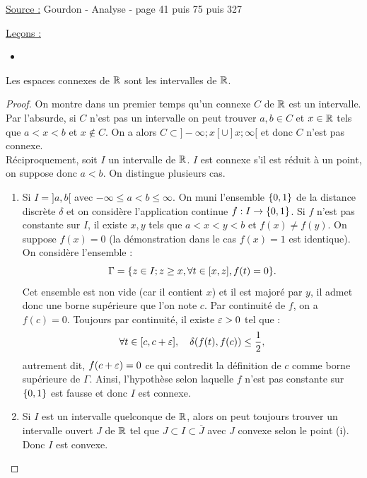 

\pagestyle{fancy}

\fancyhead[C]{}
\fancyhead[R]{}



\underline{Source :} Gourdon - Analyse - page 41 puis 75 puis 327

\underline{Leçons :}
\begin{itemize}
\item 
\end{itemize}

\begin{thm}
Les espaces connexes de $\mathbb{R}$ sont les intervalles de $\mathbb{R}$.
\end{thm}

\begin{proof}
On montre dans un premier temps qu'un connexe $C$ de $\mathbb{R}$ est un intervalle. 
Par l'absurde, si $C$ n'est pas un intervalle on peut trouver $a,b \in C$ et $x \in \mathbb{R}$ tels que $a<x<b$ et $x \not \in C$.
On a alors $C \subset ]-\infty; x [ \cup ] x ; \infty [$ et donc $C$ n'est pas connexe. \\

Réciproquement, soit $I$ un intervalle de $\mathbb{R}$. $I$ est connexe s'il est réduit à un point, on suppose donc $a<b$.
On distingue plusieurs cas.
\begin{enumerate}[label=(\roman*)]
\item 
Si $I=]a,b[$ avec $-\infty \leq a < b \leq \infty$. 
On muni l'ensemble $\{ 0,1 \}$ de la distance discrète $\delta$ et on considère l'application continue $f: I \to \{ 0,1 \}$.
Si $f$ n'est pas constante sur $I$, il existe $x,y$ tels que $a<x<y<b$ et $f(x) \neq f(y)$.
On suppose $f(x)=0$ (la démonstration dans le cas $f(x)=1$ est identique).
On considère l'ensemble :
\[ \Gamma = \{  z \in I ; z \geq x, \forall t \in [x,z], f(t) = 0  \} . \]
Cet ensemble est non vide (car il contient $x$) et il est majoré par $y$, il admet donc une borne supérieure que l'on note $c$.
Par continuité de $f$, on a $f(c)=0$. Toujours par continuité, il existe $\varepsilon >0$ tel que :
\[ \forall t \in [c, c+\varepsilon], \quad \delta(f(t), f(c)) \leq \dfrac12 , \]
autrement dit, $f(c+\varepsilon) = 0$ ce qui contredit la définition de $c$ comme borne supérieure de $\Gamma$.
Ainsi, l'hypothèse selon laquelle $f$ n'est pas constante sur $\{ 0,1 \}$ est fausse et donc $I$ est connexe.

\item
Si $I$ est un intervalle quelconque de $\mathbb{R}$, alors on peut toujours trouver un intervalle ouvert $J$ de $\mathbb{R}$ tel que 
$J \subset I \subset \overline{J}$ avec $J$ convexe selon le point (i). Donc $I$ est convexe.
\end{enumerate}
\end{proof}

